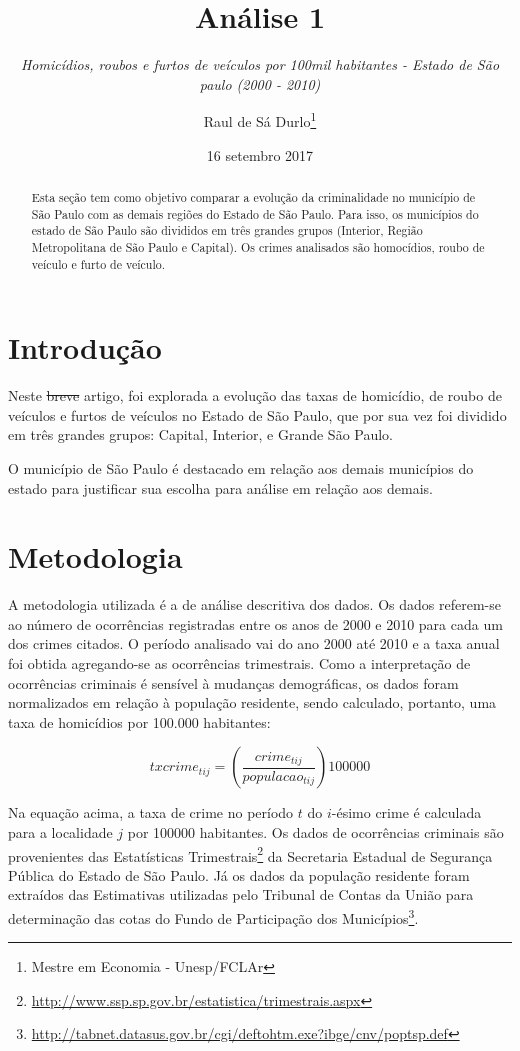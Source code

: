 \documentclass[]{article}
\title{Análise 1}
\subtitle{\emph{Homicídios, roubos e furtos de veículos por 100mil habitantes -
Estado de São paulo (2000 - 2010)}}
\author{Raul de Sá Durlo\footnote{Mestre em Economia - Unesp/FCLAr}}
\date{16 setembro 2017}
\let\rmarkdownfootnote\footnote%
\def\footnote{\protect\rmarkdownfootnote}
\begin{document}
\maketitle
\begin{abstract}
Esta seção tem como objetivo comparar a evolução da criminalidade no
município de São Paulo com as demais regiões do Estado de São Paulo.
Para isso, os municípios do estado de São Paulo são divididos em três
grandes grupos (Interior, Região Metropolitana de São Paulo e Capital).
Os crimes analisados são homocídios, roubo de veículo e furto de
veículo.
\end{abstract}

\section{Introdução}\label{introducao}

Neste \sout{breve} artigo, foi explorada a evolução das taxas de
homicídio, de roubo de veículos e furtos de veículos no Estado de São
Paulo, que por sua vez foi dividido em três grandes grupos: Capital,
Interior, e Grande São Paulo.

O município de São Paulo é destacado em relação aos demais municípios do
estado para justificar sua escolha para análise em relação aos demais.

\section{Metodologia}\label{metodologia}

A metodologia utilizada é a de análise descritiva dos dados. Os dados
referem-se ao número de ocorrências registradas entre os anos de 2000 e
2010 para cada um dos crimes citados. O período analisado vai do ano
2000 até 2010 e a taxa anual foi obtida agregando-se as ocorrências
trimestrais. Como a interpretação de ocorrências criminais é sensível à
mudanças demográficas, os dados foram normalizados em relação à
população residente, sendo calculado, portanto, uma taxa de homicídios
por 100.000 habitantes:

\[txcrime_{tij}=\left(\frac{crime_{tij}}{populacao_{tij}}\right)100000\]

Na equação acima, a taxa de crime no período \(t\) do \(i\)-ésimo crime
é calculada para a localidade \(j\) por 100000 habitantes. Os dados de
ocorrências criminais são provenientes das Estatísticas
Trimestrais\footnote{\url{http://www.ssp.sp.gov.br/estatistica/trimestrais.aspx}}
da Secretaria Estadual de Segurança Pública do Estado de São Paulo. Já
os dados da população residente foram extraídos das Estimativas
utilizadas pelo Tribunal de Contas da União para determinação das cotas
do Fundo de Participação dos Municípios\footnote{\url{http://tabnet.datasus.gov.br/cgi/deftohtm.exe?ibge/cnv/poptsp.def}}.
\end{document}
